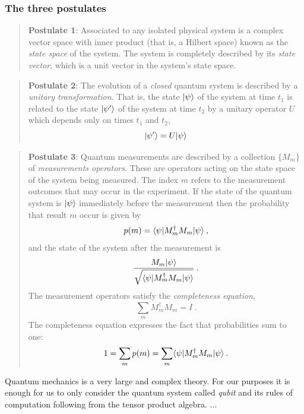 	\subsubsection*{The three postulates}
	\begin{quote}
		\textbf{Postulate 1}: Associated to any isolated physical system is a complex vector space with inner product (that is, a Hilbert space) known as the \emph{state space} of the system. 
		The system is completely described by its \emph{state vector}, which is a unit vector in the system's state space. \cite{NC10}
	\end{quote}
	
	\begin{quote}
		\textbf{Postulate 2}: The evolution of a \emph{closed} quantum system is described by a \emph{unitary transformation}. That is, the state $|\psi \rangle$ of the system at time $t_1$ is related to the state $|\psi' \rangle$ of the system at time $t_2$ by a unitary operator $U$ which depends only on times $t_1$ and $t_2$,
		$$ |\psi' \rangle = U|\psi \rangle $$
		\cite{NC10}
	\end{quote}
	
	\begin{quote}
		\textbf{Postulate 3}: Quantum measurements are described by a collection $\{M_m\}$ of \emph{measurements operators}. 
		These are operators acting on the state space of the system being measured. 
		The index $m$ refers to the measurement outcomes that may occur in the experiment. If the state of the quantum system is $|\psi \rangle$ immediately before the measurement then the probability that result $m$ occur is given by 
		$$ p(m) = \langle \psi|M_m^{\dagger}M_m|\psi \rangle \: ,$$
		and the state of the system after the measurement is 
		$$ \frac{M_m|\psi \rangle}{\sqrt{\langle \psi|M_m^{\dagger}M_m|\psi \rangle}} \: . $$
		The measurement operators satisfy the \emph{completeness equation},
		$$\sum_m  M_m^{\dagger}M_m = I \: .$$
		The completeness equation expresses the fact that probabilities sum to one:
		$$ 1 = \sum_m p(m) = \sum_m  \langle \psi|M_m^{\dagger}M_m|\psi \rangle \: .$$ 
		\cite{NC10}
	\end{quote}
	
	Quantum mechanics is a very large and complex theory. For our purposes it is enough for us to only consider the quantum system called \emph{qubit} and its rules of computation following from the tensor product algebra.  ...
	
